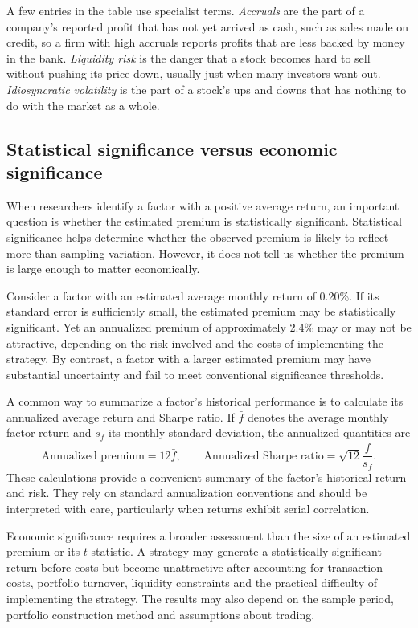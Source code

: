 A few entries in the table use specialist terms. \emph{Accruals} are the part of a company's reported profit that has not yet arrived as cash, such as sales made on credit, so a firm with high accruals reports profits that are less backed by money in the bank. \emph{Liquidity risk} is the danger that a stock becomes hard to sell without pushing its price down, usually just when many investors want out. \emph{Idiosyncratic volatility} is the part of a stock's ups and downs that has nothing to do with the market as a whole.


\subsection{Statistical significance versus economic significance}
\label{subsec:04-statistical-economic-significance}

When researchers identify a factor with a positive average return, an important question is whether the estimated premium is statistically significant. Statistical significance helps determine whether the observed premium is likely to reflect more than sampling variation. However, it does not tell us whether the premium is large enough to matter economically.

Consider a factor with an estimated average monthly return of 0.20\%. If its standard error is sufficiently small, the estimated premium may be statistically significant. Yet an annualized premium of approximately 2.4\% may or may not be attractive, depending on the risk involved and the costs of implementing the strategy. By contrast, a factor with a larger estimated premium may have substantial uncertainty and fail to meet conventional significance thresholds.

A common way to summarize a factor's historical performance is to calculate its annualized average return and Sharpe ratio. If $\bar{f}$ denotes the average monthly factor return and $s_f$ its monthly standard deviation, the annualized quantities are
\begin{equation}
  \text{Annualized premium}=12\bar{f},
  \qquad
  \text{Annualized Sharpe ratio}
  =\sqrt{12}\frac{\bar{f}}{s_f}.
  \label{eq:04-factor-sharpe}
\end{equation}
These calculations provide a convenient summary of the factor's historical return and risk. They rely on standard annualization conventions and should be interpreted with care, particularly when returns exhibit serial correlation.

Economic significance requires a broader assessment than the size of an estimated premium or its $t$-statistic. A strategy may generate a statistically significant return before costs but become unattractive after accounting for transaction costs, portfolio turnover, liquidity constraints and the practical difficulty of implementing the strategy. The results may also depend on the sample period, portfolio construction method and assumptions about trading.

